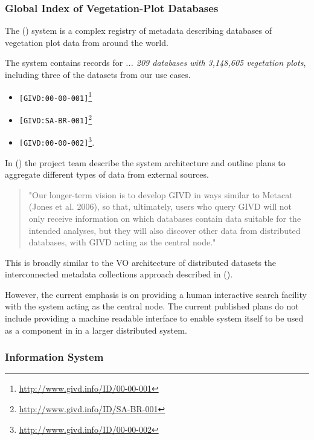 \documentclass{article}
\begin{document}
\subsubsection{Global Index of Vegetation-Plot Databases}

The  (\cite{givd}) system is a complex registry of metadata describing
databases of vegetation plot data from around the world.

The \cite{givd} system contains records for
\textit{ ... 209 databases with 3,148,605 vegetation plots},
including three of the datasets from our use cases.

\begin{itemize}
\item \cite{forest-plots} \texttt{[GIVD:00-00-001]}\footnote{\url{http://www.givd.info/ID/00-00-001}}
\item \cite{ppbio} \texttt{[GIVD:SA-BR-001]}\footnote{\url{http://www.givd.info/ID/SA-BR-001}}
\item \cite{team}  \texttt{[GIVD:00-00-002]}\footnote{\url{http://www.givd.info/ID/00-00-002}}.
\end{itemize}

In  (\cite{dengler-2011}) the \cite{givd} project team describe the system
architecture and outline plans to aggregate different types of data from external sources.

\begin{quote}
"Our longer-term vision is to develop GIVD in ways similar to Metacat (Jones et
al. 2006), so that, ultimately, users who query GIVD will not only receive
information on which databases contain data suitable for the intended analyses,
but they will also discover other data from distributed databases, with GIVD
acting as the central node."
\end{quote}

This is broadly similar to the VO architecture of distributed datasets
the interconnected metadata collections approach described in
 (\cite{jones-2006}).

However, the current emphasis is on providing a human interactive search
facility with the \cite{givd} system acting as the central node.
The current published plans do not include providing a machine readable
interface to enable \cite{givd} system itself to be used as a component in
in a larger distributed system.

\subsubsection{\cite{ppbio} Information System}
\end{document}
